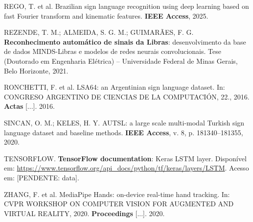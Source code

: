 REGO, T. et al. Brazilian sign language recognition using deep learning based on
fast Fourier transform and kinematic features. \textbf{IEEE Access}, 2025.

REZENDE, T. M.; ALMEIDA, S. G. M.; GUIMARÃES, F. G. \textbf{Reconhecimento
automático de sinais da Libras}: desenvolvimento da base de dados MINDS-Libras e
modelos de redes neurais convolucionais. Tese (Doutorado em Engenharia Elétrica)
– Universidade Federal de Minas Gerais, Belo Horizonte, 2021.

RONCHETTI, F. et al. LSA64: an Argentinian sign language dataset. In: CONGRESO
ARGENTINO DE CIENCIAS DE LA COMPUTACIÓN, 22., 2016. \textbf{Actas} [...]. 2016.

SINCAN, O. M.; KELES, H. Y. AUTSL: a large scale multi-modal Turkish sign
language dataset and baseline methods. \textbf{IEEE Access}, v. 8, p.
181340--181355, 2020.

TENSORFLOW. \textbf{TensorFlow documentation}: Keras LSTM layer. Disponível em:
\url{https://www.tensorflow.org/api_docs/python/tf/keras/layers/LSTM}. Acesso em:
[PENDENTE: data].

ZHANG, F. et al. MediaPipe Hands: on-device real-time hand tracking. In: CVPR
WORKSHOP ON COMPUTER VISION FOR AUGMENTED AND VIRTUAL REALITY, 2020.
\textbf{Proceedings} [...]. 2020.
\endgroup
